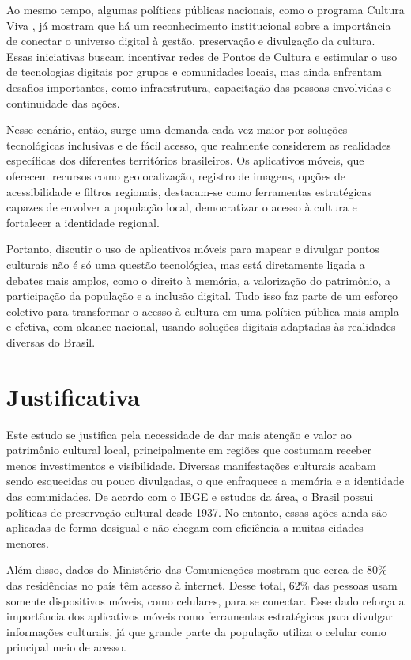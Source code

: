 Ao mesmo tempo, algumas políticas públicas nacionais, como o programa Cultura Viva \cite{prolam-cultura-viva-2025}, já mostram que há um reconhecimento institucional sobre a importância de conectar o universo digital à gestão, preservação e divulgação da cultura. Essas iniciativas buscam incentivar redes de Pontos de Cultura e estimular o uso de tecnologias digitais por grupos e comunidades locais, mas ainda enfrentam desafios importantes, como infraestrutura, capacitação das pessoas envolvidas e continuidade das ações.

Nesse cenário, então, surge uma demanda cada vez maior por soluções tecnológicas inclusivas e de fácil acesso, que realmente considerem as realidades específicas dos diferentes territórios brasileiros. Os aplicativos móveis, que oferecem recursos como geolocalização, registro de imagens, opções de acessibilidade e filtros regionais, destacam-se como ferramentas estratégicas capazes de envolver a população local, democratizar o acesso à cultura e fortalecer a identidade regional. \cite{soster2021tecnologias} \cite{oliveira-cultura-tecnologias-ufse}

Portanto, discutir o uso de aplicativos móveis para mapear e divulgar pontos culturais não é só uma questão tecnológica, mas está diretamente ligada a debates mais amplos, como o direito à memória, a valorização do patrimônio, a participação da população e a inclusão digital. Tudo isso faz parte de um esforço coletivo para transformar o acesso à cultura em uma política pública mais ampla e efetiva, com alcance nacional, usando soluções digitais adaptadas às realidades diversas do Brasil.


\section{Justificativa}

Este estudo se justifica pela necessidade de dar mais atenção e valor ao patrimônio cultural local, principalmente em regiões que costumam receber menos investimentos e visibilidade. Diversas manifestações culturais acabam sendo esquecidas ou pouco divulgadas, o que enfraquece a memória e a identidade das comunidades. De acordo com o IBGE e estudos da área, o Brasil possui políticas de preservação cultural desde 1937\cite{ibge-internet-2023}. No entanto, essas ações ainda são aplicadas de forma desigual e não chegam com eficiência a muitas cidades menores.

Além disso, dados do Ministério das Comunicações mostram que cerca de 80\% das residências no país têm acesso à internet. Desse total, 62\% das pessoas usam somente dispositivos móveis, como celulares, para se conectar\cite{mcom-2023-internet}. Esse dado reforça a importância dos aplicativos móveis como ferramentas estratégicas para divulgar informações culturais, já que grande parte da população utiliza o celular como principal meio de acesso.

